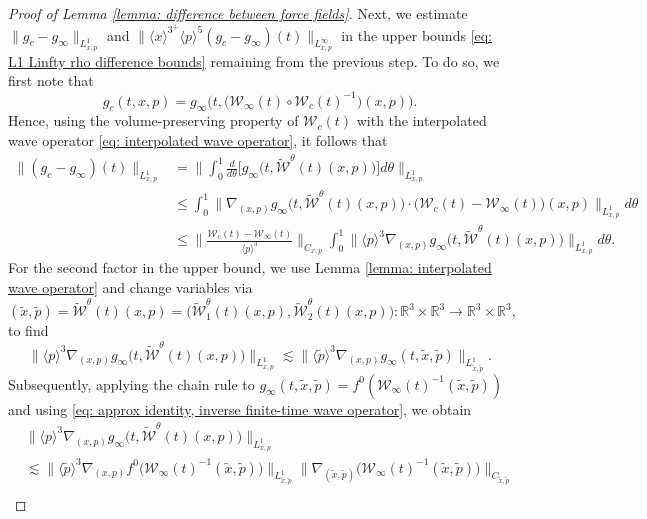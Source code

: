 \documentclass[reqno, 11pt, letterpaper]{amsart}
\theoremstyle{remark}
\numberwithin{equation}{section}
\numberwithin{theorem}{section}
\numberwithin{table}{section}
\numberwithin{figure}{section}
\begin{document}
\begin{proof}[Proof of Lemma \ref{lemma: difference between force fields}]
\noindent Next, we estimate $\|g_c-g_\infty\|_{L_{x,p}^1}$ and
$\|\langle x\rangle^{3^+}\langle p\rangle^{5}(g_c-g_\infty)(t)\|_{L^\infty_{x,p}}$
in the upper bounds \eqref{eq: L1 Linfty rho difference bounds} remaining from the previous step. To do so, we first note that 
$$g_c(t,x,p)=g_\infty\Big(t,\big(\mathcal{W}_\infty(t)\circ\mathcal{W}_c(t)^{-1}\big)(x,p)\Big).$$
Hence, using the volume-preserving property of $\mathcal{W}_c(t)$ with the interpolated wave operator \eqref{eq: interpolated wave operator}, it follows that 
$$\begin{aligned}
\|(g_c-g_\infty)
(t)\|_{L_{x,p}^1}&=\bigg\|\int_0^1 \frac{d}{d\theta}\Big[g_\infty\Big (t, \widetilde{\mathcal{W}}^\theta(t)(x,p)\Big)\Big] d\theta\bigg\|_{L_{x,p}^1}\\
&\leq\int_0^1\Big\|\nabla_{(x,p)}g_\infty\Big(t,\widetilde{\mathcal{W}}^\theta(t)(x,p)\Big)\cdot\Big(\mathcal{W}_c(t)-\mathcal{W}_\infty(t)\Big)(x,p)\Big\|_{L_{x,p}^1}d\theta\\
&\leq\bigg\|\frac{\mathcal{W}_c(t)-\mathcal{W}_\infty(t)}{\langle p\rangle^3}\bigg\|_{C_{x,p}}\int_0^1\Big\|\langle p\rangle^3\nabla_{(x,p)}g_\infty\Big(t,\widetilde{\mathcal{W}}^\theta(t)(x,p)\Big)\Big\|_{L_{x,p}^1}d\theta.
\end{aligned}$$
For the second factor in the upper bound, we use Lemma \ref{lemma: interpolated wave operator} and change variables via $$(\tilde{x},\tilde{p})=\widetilde{\mathcal{W}}^\theta(t)(x,p)=\Big(\widetilde{\mathcal{W}}_1^\theta(t)(x,p), \widetilde{\mathcal{W}}_2^\theta(t)(x,p)\Big): \mathbb{R}^3\times\mathbb{R}^3\to \mathbb{R}^3\times\mathbb{R}^3,$$ 
to find 
$$\Big\|\langle p\rangle^3\nabla_{(x,p)}g_\infty\Big(t,\widetilde{\mathcal{W}}^\theta(t)(x,p)\Big)\Big\|_{L_{x,p}^1}\lesssim\big\|\langle \tilde{p}\rangle^3\nabla_{(x,p)}g_\infty(t, \tilde{x}, \tilde{p})\big\|_{L_{\tilde{x},\tilde{p}}^1}.$$
Subsequently, applying the chain rule to $g_\infty(t,\tilde{x},\tilde{p})=f^0(\mathcal{W}_\infty(t)^{-1}(\tilde{x},\tilde{p}))$ and using \eqref{eq: approx identity, inverse finite-time wave operator}, we obtain
$$\begin{aligned}
&\Big\|\langle p\rangle^3\nabla_{(x,p)}g_\infty\Big(t,\widetilde{\mathcal{W}}^\theta(t)(x,p)\Big)\Big\|_{L_{x,p}^1}\\
&\lesssim\Big\|\langle \tilde{p}\rangle^3\nabla_{(x,p)}f^0\Big(\mathcal{W}_\infty(t)^{-1}(\tilde{x},\tilde{p})\Big)\Big\|_{L_{\tilde{x},\tilde{p}}^1}\Big\|\nabla_{(\tilde{x},\tilde{p})}\Big(\mathcal{W}_\infty(t)^{-1}(\tilde{x},\tilde{p})\Big)\Big\|_{C_{\tilde{x},\tilde{p}}}\\

\end{aligned}$$
\end{proof}
\end{document}
